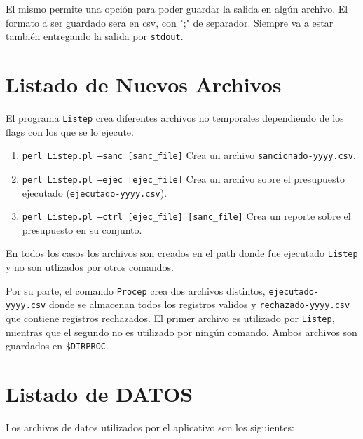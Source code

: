 \documentclass[10pt,a4paper]{article}
\begin{document}
El mismo permite una opción para poder guardar la salida en algún archivo. El formato a ser guardado sera en csv, con ";" de separador. Siempre va a estar también entregando la salida por \texttt{stdout}.

\section{Listado de Nuevos Archivos}
El programa \texttt{Listep} crea diferentes archivos no temporales dependiendo de los flags con los que se lo ejecute.

\begin{enumerate}
    \item \texttt{perl Listep.pl --sanc [sanc\_file]} Crea un archivo \texttt{sancionado-yyyy.csv}.
    \item \texttt{perl Listep.pl --ejec [ejec\_file]} Crea un archivo sobre el presupuesto ejecutado (\texttt{ejecutado-yyyy.csv}).
    \item \texttt{perl Listep.pl --ctrl [ejec\_file] [sanc\_file]} Crea un reporte sobre el presupuesto en su conjunto.
\end{enumerate}
 
 En todos los casos los archivos son creados en el path donde fue ejecutado \texttt{Listep} y no son utlizados por otros comandos.
 
 Por su parte, el comando \texttt{Procep} crea dos archivos distintos, \texttt{ejecutado-yyyy.csv} donde se almacenan todos los registros validos y \texttt{rechazado-yyyy.csv} que contiene registros rechazados. El primer archivo es utilizado por \texttt{Listep}, mientras que el segundo no es utilizado por ningún comando. Ambos archivos son guardados en \texttt{\$DIRPROC}.

\section{Listado de DATOS}
Los archivos de datos utilizados por el aplicativo son los siguientes:
\end{document}

